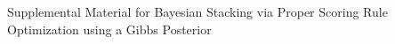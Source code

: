 \documentclass[ba]{imsart}
\theoremstyle{plain}
\theoremstyle{definition}
\theoremstyle{remark}
\begin{document}
\renewcommand{\thesection}{\Alph{section}}

\Huge
\begin{center}
Supplemental Material for Bayesian Stacking via Proper Scoring Rule
Optimization using a Gibbs Posterior
\end{center}

\normalsize













\end{document}

